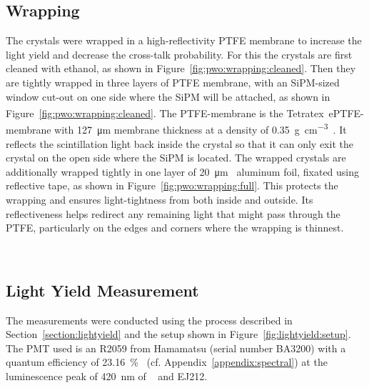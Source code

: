 \subsection{Wrapping}
The crystals were wrapped in a high-reflectivity PTFE membrane to increase the light yield and decrease the cross-talk probability.
For this the crystals are first cleaned with ethanol, as shown in Figure~\ref{fig:pwo:wrapping:cleaned}.
Then they are tightly wrapped in three layers of PTFE membrane, with an \gls{SiPM}-sized window cut-out on one side where the SiPM will be attached, as shown in Figure~\ref{fig:pwo:wrapping:cleaned}.
The PTFE-membrane is the Tetratex\textsuperscript{{\textregistered}}~ePTFE-membrane with \SI{127}{\micro\meter} membrane thickness at a density of \SI{0.35}{\gram\per\centi\meter^3}~\cite{rene}. %
It reflects the scintillation light back inside the crystal so that it can only exit the crystal on the open side where the SiPM is located.
The wrapped crystals are additionally wrapped tightly in one layer of \SI{20}{\micro\meter}~\cite{rene} aluminum foil, fixated using reflective tape, as shown in Figure~\ref{fig:pwo:wrapping:full}.
This protects the wrapping and ensures light-tightness from both inside and outside.
Its reflectiveness helps redirect any remaining light that might pass through the PTFE, particularly on the edges and corners where the wrapping is thinnest.

\begin{figure}[h]
    \centering        
    \hspace{0.02\textwidth}
    \\
\end{figure}
 
\subsection{Light Yield Measurement}
The measurements were conducted using the process described in Section~\ref{section:lightyield} and the setup shown in Figure~\ref{fig:lightyield:setup}.
The PMT used is an R2059 from Hamamatsu (serial number BA3200) with a quantum efficiency of \SI{23.16}{\percent}~\cite{datasheet:hamamatsu_R2059} (cf. Appendix~\ref{appendix:spectral}) at the luminescence peak of \SI{420}{\nano\meter} of ~\cite{cms:tdr} and EJ212.

